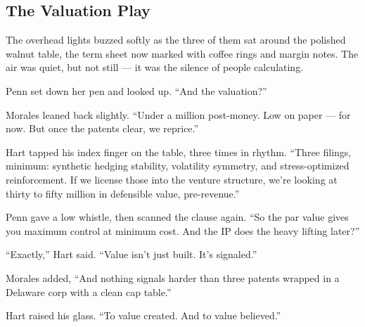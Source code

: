 \subsection{The Valuation Play}

The overhead lights buzzed softly as the three of them sat around the polished walnut table, the term sheet now marked with coffee rings and margin notes. The air was quiet, but not still — it was the silence of people calculating.

Penn set down her pen and looked up. ``And the valuation?''

Morales leaned back slightly. ``Under a million post-money. Low on paper — for now. But once the patents clear, we reprice.''

Hart tapped his index finger on the table, three times in rhythm. ``Three filings, minimum: synthetic hedging stability, 
volatility symmetry, and stress-optimized reinforcement. If we license those into the venture structure, we’re looking at 
thirty to fifty million in defensible value, pre-revenue.''

Penn gave a low whistle, then scanned the clause again. ``So the par value gives you maximum control at minimum cost. And 
the IP does the heavy lifting later?''

``Exactly,'' Hart said. ``Value isn’t just built. It’s signaled.''

Morales added, ``And nothing signals harder than three patents wrapped in a Delaware corp with a clean cap table.''

Hart raised his glass. ``To value created. And to value believed.''

\medskip


